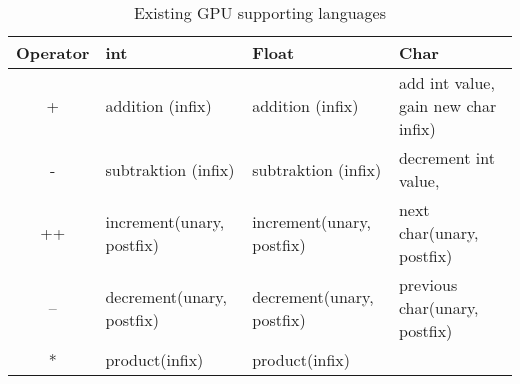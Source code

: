 \begin{table}
	\centering
	\begin{tabular}{|c|l|l|l|}
	\hline
	\textbf{Operator} & \textbf{int}       & \textbf{Float} & \textbf{Char}			  		           \\ \hline
	+   & addition (infix)                 & addition (infix)                  & add int value, gain new char infix)         \\ \hline
	-   & subtraktion (infix)              & subtraktion (infix)               & decrement int value,                        \\ \hline
	++  & increment(unary, postfix)        & increment(unary, postfix)         & next char(unary, postfix)             \\ \hline
	--  & decrement(unary, postfix)        & decrement(unary, postfix)         & previous char(unary, postfix)         \\ \hline
	*   & product(infix)                   & product(infix)                    &                                             \\ \hline
	\end{tabular}
	\caption{Existing GPU supporting languages}
	\label{tbl:operators}
\end{table}
            